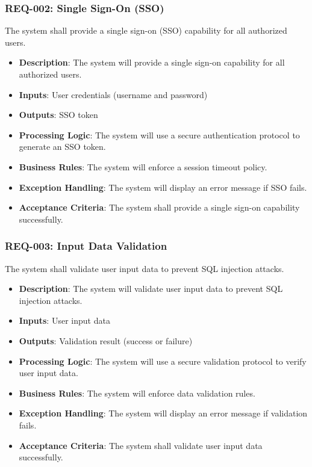 \documentclass{article}
\begin{document}
\subsubsection{REQ-002: Single Sign-On (SSO)}
The system shall provide a single sign-on (SSO) capability for all authorized users.

\begin{itemize}
\item \textbf{Description}: The system will provide a single sign-on capability for all authorized users.
\item \textbf{Inputs}: User credentials (username and password)
\item \textbf{Outputs}: SSO token
\item \textbf{Processing Logic}: The system will use a secure authentication protocol to generate an SSO token.
\item \textbf{Business Rules}: The system will enforce a session timeout policy.
\item \textbf{Exception Handling}: The system will display an error message if SSO fails.
\item \textbf{Acceptance Criteria}: The system shall provide a single sign-on capability successfully.
\end{itemize}

\subsubsection{REQ-003: Input Data Validation}
The system shall validate user input data to prevent SQL injection attacks.

\begin{itemize}
\item \textbf{Description}: The system will validate user input data to prevent SQL injection attacks.
\item \textbf{Inputs}: User input data
\item \textbf{Outputs}: Validation result (success or failure)
\item \textbf{Processing Logic}: The system will use a secure validation protocol to verify user input data.
\item \textbf{Business Rules}: The system will enforce data validation rules.
\item \textbf{Exception Handling}: The system will display an error message if validation fails.
\item \textbf{Acceptance Criteria}: The system shall validate user input data successfully.
\end{itemize}
\end{document}
